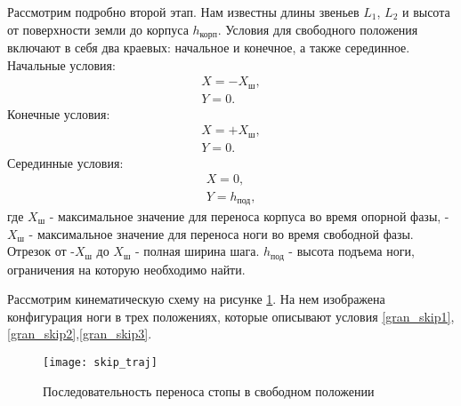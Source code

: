 Рассмотрим подробно второй этап. Нам известны длины звеньев $L_{1}$, $L_{2}$ и высота от поверхности земли до корпуса $h_{\text{корп}}$. 
Условия для свободного положения включают в себя два краевых: начальное и конечное, а также серединное.
\newline
Начальные условия:
\begin{equation}
	\begin{array}{l}
		X = -X_{\text{ш}},
		\\
		Y = 0.
	\label{gran_skip1}
	\end{array}
\end{equation}
Конечные условия:
\begin{equation}
	\begin{array}{l}
		X = +X_{\text{ш}},
		\\
		Y = 0.
	\label{gran_skip2}
	\end{array}
\end{equation}
Серединные условия:
\begin{equation}
	\begin{array}{l}
		X = 0,
		\\
		Y = h_{\text{под}},
	\end{array}
	\label{gran_skip3}
\end{equation}
где $X_{\text{ш}}$ - максимальное значение для переноса корпуса во время опорной фазы, -$X_{\text{ш}}$ - максимальное значение для переноса ноги во время свободной фазы. Отрезок от -$X_{\text{ш}}$ до $X_{\text{ш}}$ - полная ширина шага. $h_{\text{под}}$ - высота подъема ноги, ограничения на которую необходимо найти.

Рассмотрим кинематическую схему на рисунке \ref{skip_traj}. На нем изображена конфигурация ноги в трех положениях, которые описывают условия \ref{gran_skip1},\ref{gran_skip2},\ref{gran_skip3}. 
\newpage
\begin{figure}[h!]
	\begin{center}
		\texttt{[image: skip\_traj]}
		\caption{Последовательность переноса стопы в свободном положении}
		\label{skip_traj}
	\end{center}
\end{figure}

